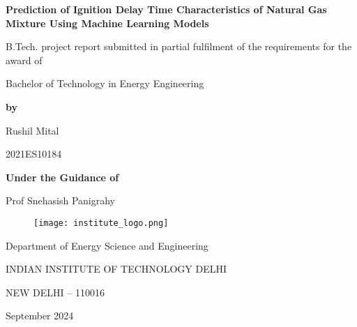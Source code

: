 \documentclass[12pt]{report}
\begin{document}
\begin{titlepage}
    \centering

    {\Huge \textbf{Prediction of Ignition Delay Time Characteristics of Natural Gas Mixture Using Machine Learning Models}\par}
    \vspace{1cm} %
    
    {\Large B.Tech. project report submitted in partial fulfilment of the requirements for the award of}\par
    
    {\Large Bachelor of Technology in Energy Engineering}\par
    
    \vspace{1cm}
    
    \textbf{by}\par
    {\Large Rushil Mital}\par
    \vspace{0.5cm}
    {\Large 2021ES10184}\par
    
    \vspace{0.5cm} %
    
    \textbf{Under the Guidance of}\par
    {\Large Prof Snehasish Panigrahy}\par
    
    \vspace{0.5cm} %

    \begin{figure}[H]
        \centering
        \texttt{[image: institute\_logo.png]} %
    \end{figure}
    
    {\Large Department of Energy Science and Engineering}\par
    \vspace{0.25cm}
    {\Large INDIAN INSTITUTE OF TECHNOLOGY DELHI}\par
    \vspace{0.25cm}
    {\Large NEW DELHI – 110016}\par
    {\Large September 2024}\par

\end{titlepage}
\end{document}
